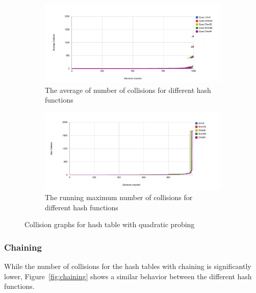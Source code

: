 \documentclass[11pt]{article}
\begin{document}
\begin{figure}
        \begin{subfigure}[b]{1\textwidth}
                \centering
                \includegraphics[width=\textwidth]{quad-collision.png}
                \caption{The average of number of collisions for different hash functions}
                \label{fig:quad-collision}
        \end{subfigure}       

         \begin{subfigure}[b]{1\textwidth}
                \centering
                \includegraphics[width=\textwidth]{max-query-quad.png}
                \caption{The running maximum number of collisions for different hash functions}
                \label{fig:quad-max}
        \end{subfigure}
        \caption{Collision graphs for hash table with quadratic probing}\label{fig:quad}
\end{figure}


\subsubsection{Chaining}
While the number of collisions for the hash tables with chaining
is significantly lower, Figure~\ref{fig:chaining} shows a similar 
behavior between the different hash functions.
\end{document}
